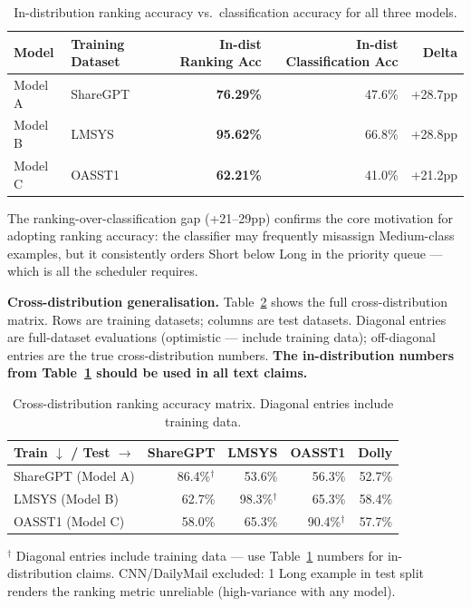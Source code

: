 \documentclass[10pt,letterpaper]{article}
\begin{document}
\begin{table}[t]
\centering
\caption{In-distribution ranking accuracy vs.\ classification accuracy for all three models.}
\label{tab:indist}
\begin{tabular}{llrrr}
\toprule
Model & Training Dataset & In-dist Ranking Acc & In-dist Classification Acc & Delta \\
\midrule
Model A & ShareGPT & \textbf{76.29\%} & 47.6\% & +28.7pp \\
Model B & LMSYS    & \textbf{95.62\%} & 66.8\% & +28.8pp \\
Model C & OASST1   & \textbf{62.21\%} & 41.0\% & +21.2pp \\
\bottomrule
\end{tabular}
\end{table}

The ranking-over-classification gap (+21--29pp) confirms the core motivation for adopting ranking accuracy: the classifier may frequently misassign Medium-class examples, but it consistently orders Short below Long in the priority queue --- which is all the scheduler requires.

\textbf{Cross-distribution generalisation.} Table~\ref{tab:crossdist} shows the full cross-distribution matrix. Rows are training datasets; columns are test datasets. Diagonal entries are full-dataset evaluations (optimistic --- include training data); off-diagonal entries are the true cross-distribution numbers. \textbf{The in-distribution numbers from Table~\ref{tab:indist} should be used in all text claims.}

\begin{table}[t]
\centering
\caption{Cross-distribution ranking accuracy matrix. Diagonal entries include training data.}
\label{tab:crossdist}
\begin{tabular}{lrrrr}
\toprule
Train $\downarrow$ / Test $\rightarrow$ & ShareGPT & LMSYS & OASST1 & Dolly \\
\midrule
ShareGPT (Model A) & 86.4\%$^\dagger$ & 53.6\%           & 56.3\%           & 52.7\% \\
LMSYS (Model B)    & 62.7\%           & 98.3\%$^\dagger$ & 65.3\%           & 58.4\% \\
OASST1 (Model C)   & 58.0\%           & 65.3\%           & 90.4\%$^\dagger$ & 57.7\% \\
\bottomrule
\end{tabular}
\smallskip\noindent\footnotesize{$^\dagger$ Diagonal entries include training data --- use Table~\ref{tab:indist} numbers for in-distribution claims. CNN/DailyMail excluded: 1 Long example in test split renders the ranking metric unreliable (high-variance with any model).}
\end{table}
\end{document}

